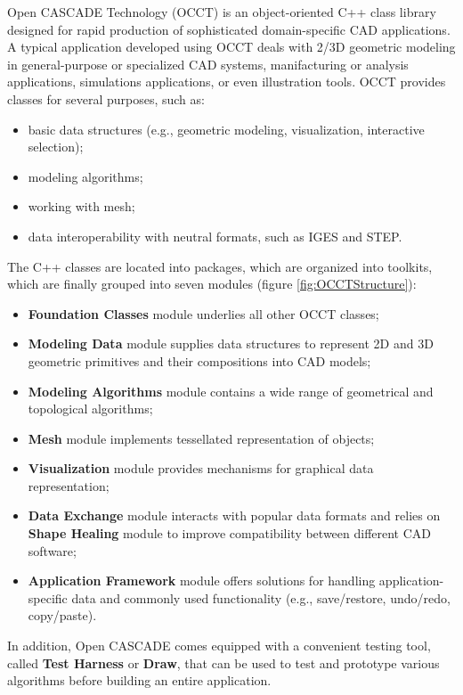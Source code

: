 \bigskip
\noindent
Open CASCADE Technology (\gls{OCCT}) is an object-oriented C++ class library designed for rapid production of sophisticated domain-specific \gls{CAD} applications. A typical application developed using \gls{OCCT} deals with 2/3D geometric modeling in general-purpose or specialized \gls{CAD} systems, manifacturing or analysis applications, simulations applications, or even illustration tools. \gls{OCCT} provides classes for several purposes, such as:
%
\begin{itemize}
\item basic data structures (e.g., geometric modeling, visualization, interactive selection);
\item modeling algorithms;
\item working with mesh;
\item data interoperability with neutral formats, such as IGES and STEP.
\end{itemize}
%
The C++ classes are located into packages, which are organized into toolkits, which are finally grouped into seven modules \cite{webOpenCASCADE} (figure \ref{fig:OCCTStructure}):
%
\begin{itemize}
\renewcommand\labelitemi{\tiny$\blacksquare$}
\item \textbf{Foundation Classes} module underlies all other \gls{OCCT} classes;
\item \textbf{Modeling Data} module supplies data structures to represent 2D and 3D geometric primitives and their compositions into \gls{CAD} models;
\item \textbf{Modeling Algorithms} module contains a wide range of geometrical and topological algorithms;
\item \textbf{Mesh} module implements tessellated representation of objects;
\item \textbf{Visualization} module provides mechanisms for graphical data representation;
\item \textbf{Data Exchange} module interacts with popular data formats and relies on \textbf{Shape Healing} module to improve compatibility between different \gls{CAD} software;
\item \textbf{Application Framework} module offers solutions for handling application-specific data and commonly used functionality (e.g., save/restore, undo/redo, copy/paste).
\end{itemize}
%
In addition, Open CASCADE comes equipped with a convenient testing tool, called \textbf{Test Harness} or \textbf{Draw}, that can be used to test and prototype various algorithms before building an entire application.
